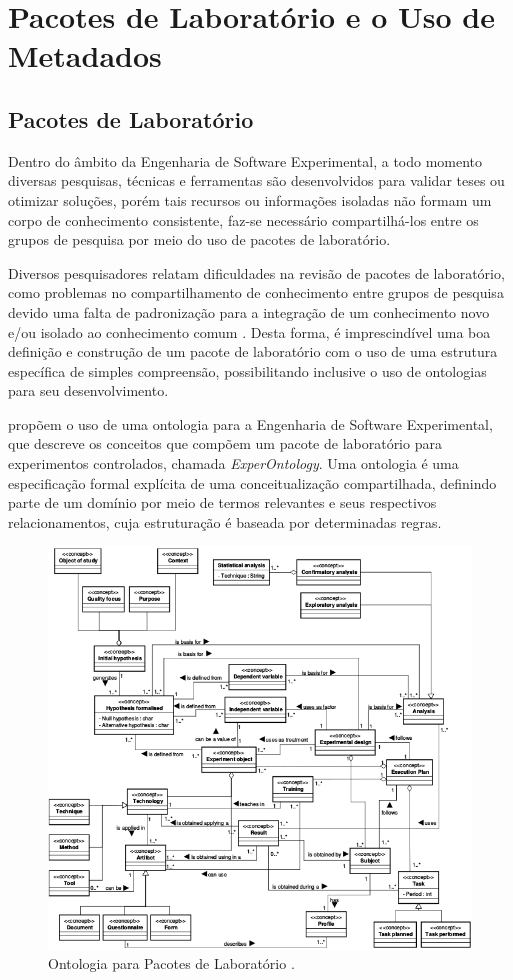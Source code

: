 \chapter{Pacotes de Laboratório e o Uso de Metadados}
\label{cp:pacotes}

\section{Pacotes de Laboratório}
Dentro do âmbito da Engenharia de Software Experimental, a todo momento diversas pesquisas, técnicas e ferramentas são desenvolvidos para validar teses ou otimizar soluções, porém tais recursos ou informações isoladas não formam um corpo de
conhecimento consistente, faz-se necessário compartilhá-los entre os grupos de pesquisa por meio do uso de pacotes de laboratório.

Diversos pesquisadores relatam dificuldades na revisão de pacotes de laboratório, como problemas no compartilhamento de conhecimento entre grupos de pesquisa devido uma falta de padronização para a integração de um conhecimento novo e/ou isolado ao conhecimento comum \cite{Scatalon11}. Desta forma, é imprescindível uma boa definição e construção
de um pacote de laboratório com o uso de uma estrutura específica de simples compreensão, possibilitando inclusive o uso de ontologias para seu desenvolvimento.

\cite{Garcia08} propõem o uso de uma ontologia para a Engenharia de Software Experimental, que descreve os conceitos que compõem um pacote de laboratório para experimentos controlados, chamada \textit{ExperOntology}.
Uma ontologia é uma especificação formal explícita de uma conceitualização compartilhada, definindo parte de um domínio por meio de termos relevantes e seus respectivos relacionamentos, cuja estruturação é baseada por determinadas regras.

\begin{figure}[!htb]
\centering
\includegraphics[scale=0.7]{images/onto.png}
\caption{Ontologia para Pacotes de Laboratório \cite{Garcia08}.}
\label{onto}
\end{figure}

